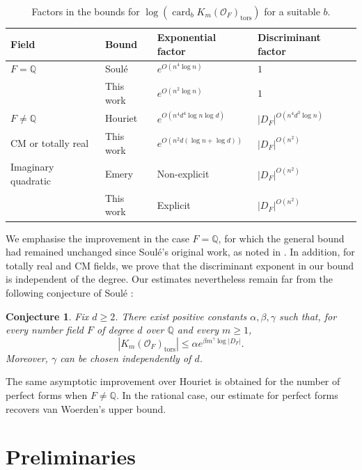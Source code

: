 \documentclass[11pt,a4paper,twoside]{amsart}
\theoremstyle{plain}
\newtheorem*{conjecture}{\bfseries Conjecture}
\theoremstyle{definition}
\newcommand{\rint}[0]{\mathcal{O}_F}
\newcommand{\disc}[0]{D_F}
\renewcommand{\leq}{\leqslant}
\renewcommand{\geq}{\geqslant}
\begin{document}
\begin{table}[ht]
\label{table}
\centering
\begin{tabular}{llll}
\hline
Field & Bound & Exponential factor & Discriminant factor \\
\hline
$F=\mathbb Q$ & Soul\'e \cite{soule_bounds} & $e^{O(n^4\log n)}$ & $1$ \\
 & This work & $e^{O(n^2\log n)}$ & $1$ \\
\hline
$F\neq\mathbb Q$ & Houriet \cite{Juliet_PHD} & $e^{O(n^4d^4\log n\log d)}$ & $|\disc|^{O(n^4d^3\log n)}$ \\
CM or totally real& This work & $e^{O(n^2d(\log n+\log d))}$ & $|\disc|^{O(n^2)}$ \\
\hline
Imaginary quadratic & Emery \cite{Emery_imaginary_quad} & Non-explicit & $|\disc|^{O(n^2)}$ \\
 & This work & Explicit & $|\disc|^{O(n^2)}$ \\
\hline
\end{tabular}
\caption{Factors in the bounds for $\log(\operatorname{card}_{b} K_m(\rint)_{\mathrm{tors}})$ for a suitable $b$.}
\end{table}
We emphasise the improvement in the case $F=\mathbb Q$, for which the general bound had remained unchanged since Soulé's original work, as noted in \cite{emery, Juliet_PHD}. In addition, for totally real and CM fields, we prove that the discriminant exponent in our bound is independent of the degree. Our estimates nevertheless remain far from the following conjecture of Soulé \cite[Section~5.1]{soule_hermitian_bounds}:
\begin{conjecture}
Fix $d\geq2$. There exist positive constants $\alpha,\beta,\gamma$ such that, for every number field $F$ of degree $d$ over $\mathbb Q$ and every $m\geq1$,
$$|K_m(\rint)_{\mathrm{tors}}|\leq\alpha e^{\beta m^\gamma\log|\disc|}.$$
Moreover, $\gamma$ can be chosen independently of $d$.
\end{conjecture}



The same asymptotic improvement over Houriet is obtained for the number of perfect forms when $F\neq\mathbb Q$. In the rational case, our estimate for perfect forms recovers van Woerden's upper bound.



\section{Preliminaries}
\end{document}
